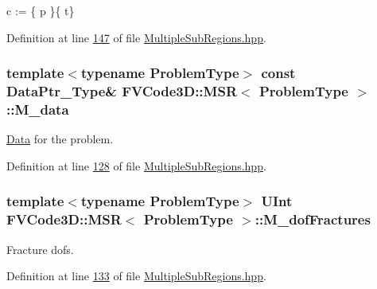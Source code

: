 c \+:= \{  p \}\{  t\} 



Definition at line \hyperlink{MultipleSubRegions_8hpp_source_l00147}{147} of file \hyperlink{MultipleSubRegions_8hpp_source}{Multiple\+Sub\+Regions.\+hpp}.

\subsubsection[{\texorpdfstring{M\+\_\+data}{M_data}}]{\setlength{\rightskip}{0pt plus 5cm}template$<$typename Problem\+Type$>$ const {\bf Data\+Ptr\+\_\+\+Type}\& {\bf F\+V\+Code3\+D\+::\+M\+SR}$<$ Problem\+Type $>$\+::M\+\_\+data\hspace{0.3cm}{\ttfamily [private]}}\hypertarget{classFVCode3D_1_1MSR_a03e013e5191655455e66563e815f262b}{}\label{classFVCode3D_1_1MSR_a03e013e5191655455e66563e815f262b}


\hyperlink{classFVCode3D_1_1Data}{Data} for the problem. 



Definition at line \hyperlink{MultipleSubRegions_8hpp_source_l00128}{128} of file \hyperlink{MultipleSubRegions_8hpp_source}{Multiple\+Sub\+Regions.\+hpp}.

\subsubsection[{\texorpdfstring{M\+\_\+dof\+Fractures}{M_dofFractures}}]{\setlength{\rightskip}{0pt plus 5cm}template$<$typename Problem\+Type$>$ {\bf U\+Int} {\bf F\+V\+Code3\+D\+::\+M\+SR}$<$ Problem\+Type $>$\+::M\+\_\+dof\+Fractures\hspace{0.3cm}{\ttfamily [private]}}\hypertarget{classFVCode3D_1_1MSR_ae96e6d741dd194e8be925062759acbc9}{}\label{classFVCode3D_1_1MSR_ae96e6d741dd194e8be925062759acbc9}


Fracture dofs. 



Definition at line \hyperlink{MultipleSubRegions_8hpp_source_l00133}{133} of file \hyperlink{MultipleSubRegions_8hpp_source}{Multiple\+Sub\+Regions.\+hpp}.

